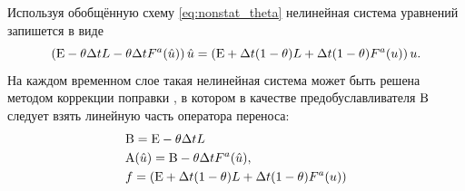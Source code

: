 Используя обобщённую схему \cref{eq:nonstat_theta}
нелинейная система уравнений запишется в виде
\begin{equation}
\label{eq:tvd_theta_sle}
\left({\rm E} - \theta \Delta t L - \theta \Delta t F^a(\hat u)\right) \hat u = \left({\rm E} + \Delta t (1 - \theta) L + \Delta t (1 - \theta) F^a(u)\right) u.
\end{equation}
На каждом временном слое такая нелинейная система может быть решена методом коррекции поправки ,
в котором в качестве предобуславливателя ${\rm B}$ следует взять линейную часть оператора переноса:
\begin{align*}
&{\rm B} = {\rm E} - \theta \Delta t L \\
&{\rm A}(\hat u) = {\rm B} - \theta \Delta t F^a(\hat u), \\
&f = \left({\rm E} + \Delta t (1 - \theta) L + \Delta t (1 - \theta) F^a(u)\right)
\end{align*}
